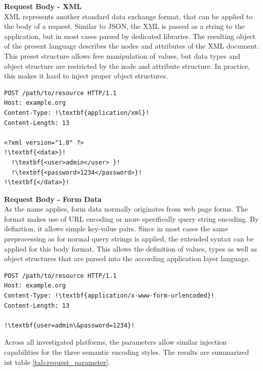 \textbf{Request Body - XML}\\
XML represents another standard data exchange format, that can be applied to the body of a request. Similar to JSON, the XML is passed as a string to the application, but in most cases parsed by dedicated libraries. The resulting object of the present language describes the nodes and attributes of the XML document. This preset structure allows free manipulation of values, but data types and object structure are restricted by the node and attribute structure. In practice, this makes it hard to inject proper object structures.\\

\begin{lstlisting}[escapechar=!, caption={Example for HTTP request}, label={lst:http_request_example}]
POST /path/to/resource HTTP/1.1
Host: example.org
Content-Type: !\textbf{application/xml}!
Content-Length: 13

<?xml version="1.0" ?>
!\textbf{<data>}!
  !\textbf{<user>admin</user> }!
  !\textbf{<password>1234</password>}!
!\textbf{</data>}!
\end{lstlisting}

\textbf{Request Body - Form Data}\\
As the name applies, form data normally originates from web page forms. The format makes use of URL encoding or more specifically query string encoding. By definition, it allows simple key-value pairs. Since in most cases the same preprocessing as for normal query strings is applied, the extended syntax can be applied for this body format. This allows the definition of values, types as well as object structures that are parsed into the according application layer language.\\

\begin{lstlisting}[escapechar=!, caption={Example for HTTP request}, label={lst:http_request_example}]
POST /path/to/resource HTTP/1.1
Host: example.org
Content-Type: !\textbf{application/x-www-form-urlencoded}!
Content-Length: 13

!\textbf{user=admin\&password=1234}!
\end{lstlisting}

Across all investigated platforms, the parameters allow similar injection capabilities for the three semantic encoding styles. The results are summarized int table \ref{tab:request_parameter}.

